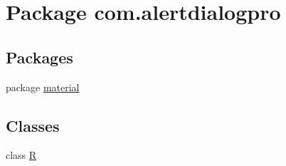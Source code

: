 \hypertarget{namespacecom_1_1alertdialogpro}{}\section{Package com.\+alertdialogpro}
\label{namespacecom_1_1alertdialogpro}
\subsection*{Packages}
\begin{DoxyCompactItemize}
\item 
package \hyperlink{namespacecom_1_1alertdialogpro_1_1material}{material}
\end{DoxyCompactItemize}
\subsection*{Classes}
\begin{DoxyCompactItemize}
\item 
class \hyperlink{classcom_1_1alertdialogpro_1_1_r}{R}
\end{DoxyCompactItemize}
